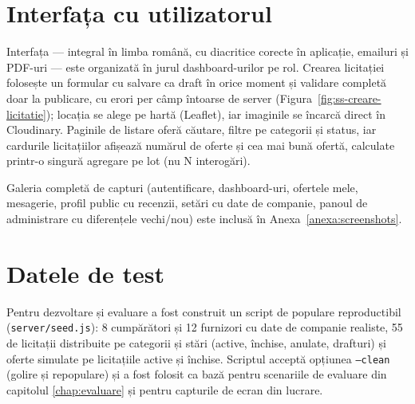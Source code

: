 \section{Interfața cu utilizatorul}

Interfața --- integral în limba română, cu diacritice corecte în aplicație, emailuri și PDF-uri --- este organizată în jurul dashboard-urilor pe rol. Crearea licitației folosește un formular cu salvare ca draft în orice moment și validare completă doar la publicare, cu erori per câmp întoarse de server (Figura~\ref{fig:ss-creare-licitatie}); locația se alege pe hartă (Leaflet), iar imaginile se încarcă direct în Cloudinary. Paginile de listare oferă căutare, filtre pe categorii și status, iar cardurile licitațiilor afișează numărul de oferte și cea mai bună ofertă, calculate printr-o singură agregare pe lot (nu N interogări).


Galeria completă de capturi (autentificare, dashboard-uri, ofertele mele, mesagerie, profil public cu recenzii, setări cu date de companie, panoul de administrare cu diferențele vechi/nou) este inclusă în Anexa~\ref{anexa:screenshots}.

\section{Datele de test}

Pentru dezvoltare și evaluare a fost construit un script de populare reproductibil (\texttt{server/seed.js}): 8 cumpărători și 12 furnizori cu date de companie realiste, 55 de licitații distribuite pe categorii și stări (active, închise, anulate, drafturi) și oferte simulate pe licitațiile active și închise. Scriptul acceptă opțiunea \texttt{--clean} (golire și repopulare) și a fost folosit ca bază pentru scenariile de evaluare din capitolul \ref{chap:evaluare} și pentru capturile de ecran din lucrare.
